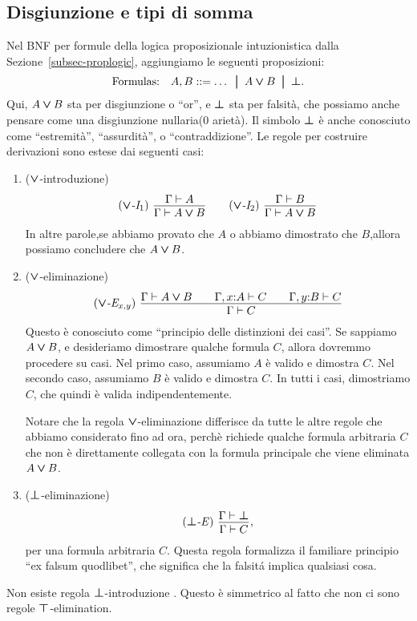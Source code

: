 \documentclass{article}
\begin{document}
\subsection{Disgiunzione e tipi di somma}

Nel BNF per formule della logica proposizionale intuzionistica dalla
Sezione~\ref{subsec-proplogic}, aggiungiamo le seguenti proposizioni:
\[ \mbox{Formulas:}\ssep A,B \bnf \ldots \bor A\cor B \bor \cfalse.
\]
Qui, $A\mathbin{\textrm{\rm\boldmath $\vee$}} B$ sta per disgiunzione o ``or'', e $\textrm{\rm\boldmath $\bot$}$
sta per falsit\`a, che possiamo anche pensare come una disgiunzione 
nullaria(0 ariet\`a). Il simbolo $\textrm{\rm\boldmath $\bot$}$ è anche conosciuto come
``estremit\`a'', ``assurdit\`a'', o ``contraddizione''.  Le regole per
 costruire derivazioni sono estese dai seguenti casi:
\begin{enumerate}
\resumeenumerate
\item ($\mathbin{\textrm{\rm\boldmath $\vee$}}$-introduzione)
\[ \trule{$\cor$-I$_1$}\ \deriv{\Gamma\tj A}{\Gamma\tj A\cor B}
\sep
\trule{$\cor$-I$_2$}\ \deriv{\Gamma\tj B}{\Gamma\tj A\cor B}
\]
In altre parole,se abbiamo provato che $A$ o abbiamo dimostrato che $B$,allora
possiamo concludere che $A\mathbin{\textrm{\rm\boldmath $\vee$}} B$.
\item ($\mathbin{\textrm{\rm\boldmath $\vee$}}$-eliminazione)
\[ \trule{$\cor$-E$_{x,y}$}\ \deriv{\Gamma\tj A\cor B
  \sep \Gamma,\typ{x}{A}\tj C
  \sep \Gamma,\typ{y}{B}\tj C}{\Gamma\tj C}
\]
Questo \`e conosciuto come ``principio delle distinzioni dei casi''. Se sappiamo
$A\mathbin{\textrm{\rm\boldmath $\vee$}} B$, e desideriamo dimostrare qualche formula $C$, allora dovremmo procedere
su casi. Nel primo caso, assumiamo $A$ \`e valido e dimostra $C$. Nel
secondo caso, assumiamo $B$ \`e valido e dimostra $C$. In tutti i casi, 
dimostriamo $C$, che quindi è valida indipendentemente. 

Notare che la regola $\mathbin{\textrm{\rm\boldmath $\vee$}}$-eliminazione differisce da tutte le altre regole che
abbiamo considerato fino ad ora, perch\`e richiede qualche formula arbitraria $C$
che non \`e direttamente collegata con la formula principale che viene eliminata $A\mathbin{\textrm{\rm\boldmath $\vee$}} B$.
\item ($\textrm{\rm\boldmath $\bot$}$-eliminazione)
\[ \trule{$\cfalse$-E}\ \deriv{\Gamma\tj\cfalse}{\Gamma\tj C},
\]
per una formula arbitraria $C$. Questa regola formalizza il familiare
principio ``ex falsum quodlibet'', che significa che la falsit\'a 
implica qualsiasi cosa.
\end{enumerate}

Non esiste regola $\textrm{\rm\boldmath $\bot$}$-introduzione . Questo \`e simmetrico al fatto 
che non ci sono regole $\textrm{\rm\boldmath $\top$}$-elimination.
\end{document}
